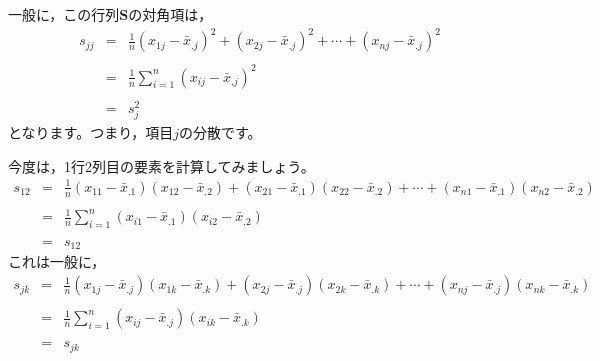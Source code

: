 \documentclass{ltjsbook}
\begin{document}
一般に，この行列$\bm{S}$の対角項は，
\[
	\begin{array}{ccl}
		s_{jj} & = & \frac{1}{n}(x_{1j} -\bar{x}_{.j})^2+(x_{2j} -\bar{x}_{.j})^2+\cdots+(x_{nj} -\bar{x}_{.j})^2 \\
		       &   &                                                                                              \\
		       & = & \frac{1}{n} \sum_{i=1}^n (x_{ij} - \bar{x}_{.j})^2                                           \\
		       &   &                                                                                              \\
		       & = & s_j^2
	\end{array}
\]
となります。つまり，項目$j$の分散です。

今度は，1行2列目の要素を計算してみましょう。
\[
	\begin{array}{ccl}
		s_{12} & = & \frac{1}{n}(x_{11}-\bar{x}_{.1})(x_{12} - \bar{x}_{.2}) + (x_{21}-\bar{x}_{.1})(x_{22} - \bar{x}_{.2})+\cdots+(x_{n1}-\bar{x}_{.1})(x_{n2} - \bar{x}_{.2}) \\
		       &   &                                                                                                                                                            \\
		       & = & \frac{1}{n} \sum_{i=1}^n (x_{i1}-\bar{x}_{.1})(x_{i2} - \bar{x}_{.2})                                                                                      \\
		       &   &                                                                                                                                                            \\
		       & = & s_{12}
	\end{array}
\]
これは一般に，
\[
	\begin{array}{ccl}
		s_{jk} & = & \frac{1}{n}(x_{1j}-\bar{x}_{.j})(x_{1k} - \bar{x}_{.k}) + (x_{2j}-\bar{x}_{.j})(x_{2k} - \bar{x}_{.k})+\cdots+(x_{nj}-\bar{x}_{.j})(x_{nk} - \bar{x}_{.k}) \\
		       &   &                                                                                                                                                            \\
		       & = & \frac{1}{n} \sum_{i=1}^n (x_{ij}-\bar{x}_{.j})(x_{ik} - \bar{x}_{.k})                                                                                      \\
		       &   &                                                                                                                                                            \\
		       & = & s_{jk}
	\end{array}
\]
\end{document}

